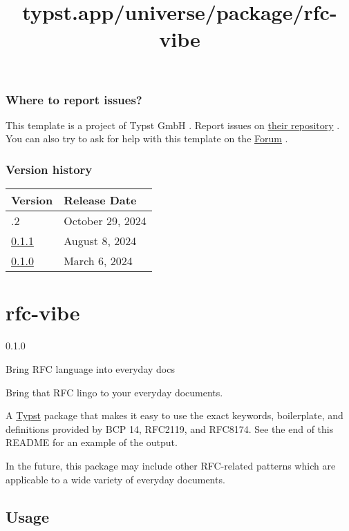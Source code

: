 \subsubsection{Where to report issues?}\label{where-to-report-issues}

This template is a project of Typst GmbH . Report issues on
\href{https://github.com/typst/templates}{their repository} . You can
also try to ask for help with this template on the
\href{https://forum.typst.app}{Forum} .

\label{versions}
\subsubsection{Version history}\label{version-history}

\begin{longtable}[]{@{}ll@{}}
\toprule\noalign{}
Version & Release Date \\
\midrule\noalign{}
\endhead
\bottomrule\noalign{}
\endlastfoot
0.1.2 & October 29, 2024 \\
\href{https://typst.app/universe/package/unequivocal-ams/0.1.1/}{0.1.1}
& August 8, 2024 \\
\href{https://typst.app/universe/package/unequivocal-ams/0.1.0/}{0.1.0}
& March 6, 2024 \\
\end{longtable}


\title{typst.app/universe/package/rfc-vibe}

\label{banner}
\section{rfc-vibe}\label{rfc-vibe}

{ 0.1.0 }

Bring RFC language into everyday docs

\label{readme}
Bring that RFC lingo to your everyday documents.

A \href{https://typst.app/}{Typst} package that makes it easy to use the
exact keywords, boilerplate, and definitions provided by BCP 14,
RFC2119, and RFC8174. See the end of this README for an example of the
output.

In the future, this package may include other RFC-related patterns which
are applicable to a wide variety of everyday documents.

\subsection{Usage}\label{usage}


